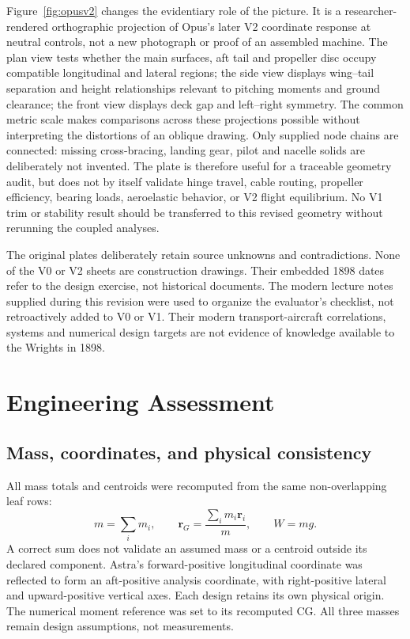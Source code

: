 \documentclass[11pt,a4paper]{article}
\begin{document}
Figure~\ref{fig:opusv2} changes the evidentiary role of the picture. It is a researcher-rendered orthographic projection of Opus's later V2 coordinate response at neutral controls, not a new photograph or proof of an assembled machine. The plan view tests whether the main surfaces, aft tail and propeller disc occupy compatible longitudinal and lateral regions; the side view displays wing--tail separation and height relationships relevant to pitching moments and ground clearance; the front view displays deck gap and left--right symmetry. The common metric scale makes comparisons across these projections possible without interpreting the distortions of an oblique drawing. Only supplied node chains are connected: missing cross-bracing, landing gear, pilot and nacelle solids are deliberately not invented. The plate is therefore useful for a traceable geometry audit, but does not by itself validate hinge travel, cable routing, propeller efficiency, bearing loads, aeroelastic behavior, or V2 flight equilibrium. No V1 trim or stability result should be transferred to this revised geometry without rerunning the coupled analyses.

The original plates deliberately retain source unknowns and contradictions. None of the V0 or V2 sheets are construction drawings. Their embedded 1898 dates refer to the design exercise, not historical documents. The modern lecture notes supplied during this revision were used to organize the evaluator's checklist, not retroactively added to V0 or V1. Their modern transport-aircraft correlations, systems and numerical design targets are not evidence of knowledge available to the Wrights in 1898.

\section{Engineering Assessment}
\subsection{Mass, coordinates, and physical consistency}
All mass totals and centroids were recomputed from the same non-overlapping leaf rows:
\begin{equation}
m=\sum_i m_i,\qquad \boldsymbol r_G=\frac{\sum_i m_i\boldsymbol r_i}{m},\qquad W=mg.
\label{eq:mass}
\end{equation}
A correct sum does not validate an assumed mass or a centroid outside its declared component. Astra's forward-positive longitudinal coordinate was reflected to form an aft-positive analysis coordinate, with right-positive lateral and upward-positive vertical axes. Each design retains its own physical origin. The numerical moment reference was set to its recomputed CG. All three masses remain design assumptions, not measurements.
\end{document}
